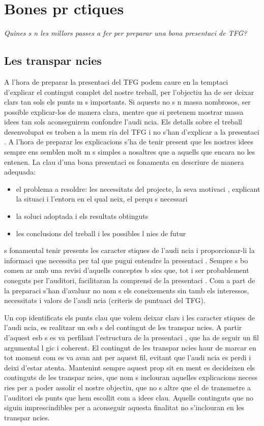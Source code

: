 \section{Bones pr ctiques}
\emph{Quines s n les millors passes a fer per preparar una bona presentaci  de \ac{TFG}?}

\subsection{Les transpar ncies}

        A l'hora de preparar la presentaci  del \ac{TFG} podem caure en la temptaci  d'explicar el contingut complet del nostre treball, per  l'objectiu ha de ser deixar clars tan sols els punts m s importants. Si aquests no s n massa nombrosos, ser  possible explicar-los de manera clara, mentre que si pretenem mostrar massa idees tan sols aconseguirem confondre l'audi ncia. Els detalls sobre el treball desenvolupat es troben a la mem ria del \ac{TFG} i no s'han d'explicar a la presentaci . A l'hora de preparar les explicacions s'ha de tenir present que les nostres idees sempre ens semblen molt m s simples a nosaltres que a aquells que encara no les entenen. La clau d'una bona presentaci  es fonamenta en descriure de manera adequada:
        \begin{itemize}\tightlist
            \item el problema a resoldre: les necessitats del projecte, la seva motivaci , explicant la situaci  i l'entorn en el qual neix, el perqu   s necessari
            \item la soluci  adoptada i els resultats obtinguts
            \item les conclusions del treball i les possibles l nies de futur
        \end{itemize}

         s fonamental tenir presents les caracter stiques de l'audi ncia i proporcionar-li la informaci  que necessita per tal que pugui entendre la presentaci . Sempre  s bo comen ar amb una revisi  d'aquells conceptes b sics que, tot i ser probablement coneguts per l'auditori, facilitaran la comprensi  de la presentaci . Com a part de la preparaci  s'han d'avaluar no nom s els coneixements sin  tamb  els interessos, necessitats i valors de l'audi ncia (criteris de puntuaci  del \ac{TFG}).

        Un cop identificats els punts clau que volem deixar clars i les caracter stiques de l'audi ncia, es realitzar  un esb s del contingut de les transpar ncies. A partir d'aquest esb s es va perfilant l'estructura de la presentaci , que ha de seguir un fil argumental l gic i coherent. El contingut de les transpar ncies haur  de marcar en tot moment com es va avan ant per aquest fil, evitant que l'audi ncia es perdi i deixi d'estar atenta. Mantenint sempre aquest prop sit en ment es decideixen els continguts de les transpar ncies, que nom s inclouran aquelles explicacions necess ries per a poder assolir el nostre objectiu, que no  s altre que el de transmetre a l'auditori els punts que hem escollit com a idees clau. Aquells continguts que no siguin imprescindibles per a aconseguir aquesta finalitat no s'inclouran en les transpar ncies.


